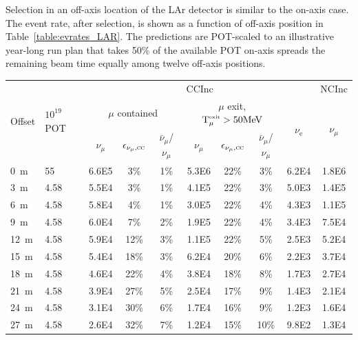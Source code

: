 
Selection in an off-axis location of the LAr detector is similar to the on-axis case. The event rate, after selection, is shown as a function of off-axis position in Table~\ref{table:evrates_LAR}.  The predictions are POT-scaled to an illustrative year-long run plan that takes 50\% of the available POT on-axis spreads the remaining beam time equally among  twelve off-axis positions.  



\begin{table}
\begin{tabular}{ l l || c c | c || c c | c | c || c }
\multirow{3}{*}{Offset} & \multirow{3}{*}{$10^{19}$POT} & \multicolumn{7}{c||}{CCInc} & NCInc \\
\cline{3-10}
& & \multicolumn{3}{c||}{$\mu$ contained} & \multicolumn{3}{c|}{$\mu$ exit, $\textrm{T}_{\mu}^\textrm{\tiny exit} > 50 \textrm{MeV}$} & \multirow{2}{*}{$\nu_\textrm{e}$} & \multirow{2}{*}{$\nu_{\mu}$} \\
& & $\nu_{\mu}$ & $\epsilon_{\nu_{\mu},\textsc{cc}}$ & $\bar{\nu}_{\mu}$/$\nu_{\mu}$ & $\nu_{\mu}$ & $\epsilon_{\nu_{\mu},\textsc{cc}}$ & $\bar{\nu}_{\mu}$/$\nu_{\mu}$ & & \\ \hline
 0~m  &  55  & 6.6E5 & 3\% & 1\% & 5.3E6 & 22\% & 3\% & 6.2E4 & 1.8E6 \\
 3~m  &  4.58  & 5.5E4 & 3\% & 1\% & 4.1E5 & 22\% & 3\% & 5.0E3 & 1.4E5  \\
 6~m  &  4.58  & 5.8E4 & 4\% & 1\% & 3.0E5 & 22\% & 4\% & 4.3E3 & 1.1E5 \\
 9~m  &  4.58  & 6.0E4 & 7\% & 2\% & 1.9E5 & 22\% & 4\% & 3.4E3 & 7.5E4 \\
 12~m  &  4.58  & 5.9E4 & 12\% & 3\% & 1.1E5 & 22\% & 5\% & 2.5E3 & 5.2E4 \\
 15~m  &  4.58  & 5.4E4 & 18\% & 3\% & 6.2E4 & 20\% & 6\% & 2.2E3 & 3.7E4 \\
 18~m  &  4.58  & 4.6E4 & 22\% & 4\% & 3.8E4 & 18\% & 8\% & 1.7E3 & 2.7E4 \\
 21~m  &  4.58  & 3.9E4 & 27\% & 5\% & 2.5E4 & 17\% & 9\% & 1.4E3 & 2.1E4 \\
 24~m  &  4.58  & 3.1E4 & 30\% & 6\% & 1.7E4 & 16\% & 9\% & 1.2E3 & 1.6E4 \\
 27~m  &  4.58  & 2.6E4 & 32\% & 7\% & 1.2E4 & 15\% & 10\% & 9.8E2 & 1.3E4 \\

\end{tabular}
\end{table}
